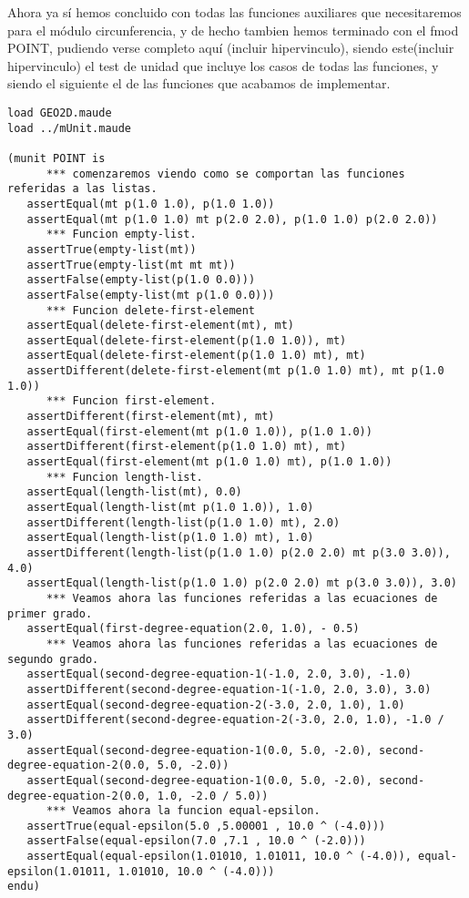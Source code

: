 \documentclass[12pt,a4paper]{book}
\begin{document}
Ahora ya s\'i hemos concluido con todas las funciones auxiliares que necesitaremos para el m\'odulo circunferencia, y de hecho tambien hemos terminado con el fmod POINT, pudiendo verse completo aqu\'i (incluir hipervinculo), siendo este(incluir hipervinculo) el test de unidad que incluye los casos de todas las funciones, y siendo el siguiente el de las funciones que acabamos de implementar. \par

\begin{verbatim}
load GEO2D.maude
load ../mUnit.maude

(munit POINT is
      *** comenzaremos viendo como se comportan las funciones referidas a las listas.
   assertEqual(mt p(1.0 1.0), p(1.0 1.0))
   assertEqual(mt p(1.0 1.0) mt p(2.0 2.0), p(1.0 1.0) p(2.0 2.0))
      *** Funcion empty-list.
   assertTrue(empty-list(mt))
   assertTrue(empty-list(mt mt mt))
   assertFalse(empty-list(p(1.0 0.0)))
   assertFalse(empty-list(mt p(1.0 0.0)))
      *** Funcion delete-first-element
   assertEqual(delete-first-element(mt), mt)
   assertEqual(delete-first-element(p(1.0 1.0)), mt)
   assertEqual(delete-first-element(p(1.0 1.0) mt), mt)
   assertDifferent(delete-first-element(mt p(1.0 1.0) mt), mt p(1.0 1.0))
      *** Funcion first-element.
   assertDifferent(first-element(mt), mt)
   assertEqual(first-element(mt p(1.0 1.0)), p(1.0 1.0))
   assertDifferent(first-element(p(1.0 1.0) mt), mt)
   assertEqual(first-element(mt p(1.0 1.0) mt), p(1.0 1.0))
      *** Funcion length-list.
   assertEqual(length-list(mt), 0.0)
   assertEqual(length-list(mt p(1.0 1.0)), 1.0)
   assertDifferent(length-list(p(1.0 1.0) mt), 2.0)
   assertEqual(length-list(p(1.0 1.0) mt), 1.0)
   assertDifferent(length-list(p(1.0 1.0) p(2.0 2.0) mt p(3.0 3.0)), 4.0)
   assertEqual(length-list(p(1.0 1.0) p(2.0 2.0) mt p(3.0 3.0)), 3.0)
      *** Veamos ahora las funciones referidas a las ecuaciones de primer grado.
   assertEqual(first-degree-equation(2.0, 1.0), - 0.5)
      *** Veamos ahora las funciones referidas a las ecuaciones de segundo grado.
   assertEqual(second-degree-equation-1(-1.0, 2.0, 3.0), -1.0)
   assertDifferent(second-degree-equation-1(-1.0, 2.0, 3.0), 3.0)
   assertEqual(second-degree-equation-2(-3.0, 2.0, 1.0), 1.0)
   assertDifferent(second-degree-equation-2(-3.0, 2.0, 1.0), -1.0 / 3.0)
   assertEqual(second-degree-equation-1(0.0, 5.0, -2.0), second-degree-equation-2(0.0, 5.0, -2.0))
   assertEqual(second-degree-equation-1(0.0, 5.0, -2.0), second-degree-equation-2(0.0, 1.0, -2.0 / 5.0))
      *** Veamos ahora la funcion equal-epsilon.
   assertTrue(equal-epsilon(5.0 ,5.00001 , 10.0 ^ (-4.0)))
   assertFalse(equal-epsilon(7.0 ,7.1 , 10.0 ^ (-2.0)))
   assertEqual(equal-epsilon(1.01010, 1.01011, 10.0 ^ (-4.0)), equal-epsilon(1.01011, 1.01010, 10.0 ^ (-4.0)))
endu)
\end{verbatim}
\end{document}
